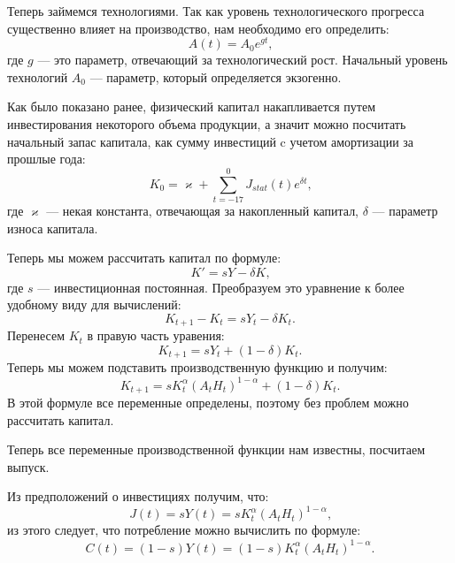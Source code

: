 Теперь займемся технологиями.
Так как уровень технологического прогресса существенно влияет на производство, нам необходимо его определить:
\begin{equation*}
A(t) = A_{0}e^{gt}\text{,}
\end{equation*}
где $g$ --- это параметр, отвечающий за технологический рост.
Начальный уровень технологий $A_0$ --- параметр, который определяется экзогенно.

Как было показано ранее, физический капитал накапливается путем инвестирования некоторого объема продукции, а значит можно посчитать начальный запас капитала, как сумму инвестиций c учетом амортизации за прошлые года:
\begin{equation*}
	K_0= \varkappa + \sum\limits_{t = -17}^{0}J_{stat}(t) e^{\delta t}\text{,}
\end{equation*}
где $\varkappa$ --- некая константа, отвечающая за накопленный капитал, $\delta$ --- параметр износа капитала.

Теперь мы можем рассчитать капитал по формуле:
\begin{equation*}
	K'=sY - \delta K \text{,}
\end{equation*}
где $s$ --- инвестиционная постоянная.
Преобразуем это уравнение к более удобному виду для вычислений:
\begin{equation*}
	K_{t+1} - K_{t} = sY_t - \delta K_{t}\text{.}
\end{equation*}
Перенесем $K_{t}$ в правую часть уравения:
\begin{equation*}
K_{t+1} = s Y_t + (1 - \delta)K_{t}\text{.}
\end{equation*}
Теперь мы можем подставить производственную функцию и получим:
\begin{equation*}
	K_{t+1} = sK_{t}^{\alpha}(A_tH_t)^{1-\alpha} + (1 - \delta)K_{t}\text{.}
\end{equation*}
В этой формуле все переменные определены, поэтому без проблем можно рассчитать капитал.

Теперь все переменные производственной функции нам известны, посчитаем выпуск.

Из предположений о инвестициях получим, что:
\begin{equation*}
	J(t)=sY(t)=sK_{t}^{\alpha}(A_tH_t)^{1-\alpha}\text{,}
\end{equation*}
из этого следует, что потребление можно вычислить по формуле:
\begin{equation*}
	C(t) = (1-s)Y(t)= (1-s)K_{t}^{\alpha}(A_tH_t)^{1-\alpha}\text{.}
\end{equation*}

